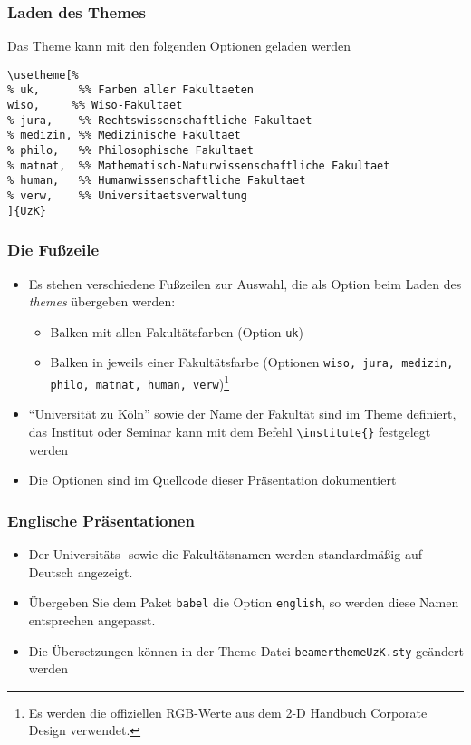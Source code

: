 \documentclass[9pt]{beamer}
\begin{document}
\begin{frame}[fragile]
  \frametitle{Laden des Themes}
  \begin{block}{Das Theme kann mit den folgenden Optionen geladen werden}
    \begin{small}
\begin{verbatim}
\usetheme[%
% uk,      %% Farben aller Fakultaeten
wiso,     %% Wiso-Fakultaet
% jura,    %% Rechtswissenschaftliche Fakultaet
% medizin, %% Medizinische Fakultaet
% philo,   %% Philosophische Fakultaet
% matnat,  %% Mathematisch-Naturwissenschaftliche Fakultaet
% human,   %% Humanwissenschaftliche Fakultaet
% verw,    %% Universitaetsverwaltung
]{UzK}
\end{verbatim}
    \end{small}

  \end{block}
\end{frame}

\begin{frame}
  \frametitle{Die Fußzeile}

  \begin{itemize}
  \item Es stehen verschiedene Fußzeilen zur Auswahl, die als Option
    beim Laden des \emph{themes} übergeben werden:
    \begin{itemize}
    \item Balken mit allen Fakultätsfarben (Option \texttt{uk})
    \item Balken in jeweils einer Fakultätsfarbe (Optionen \texttt{wiso, jura,
        medizin, philo, matnat, human, verw})\footnote{Es werden die offiziellen
        RGB-Werte aus dem 2-D Handbuch Corporate Design verwendet.}
    \end{itemize}
  \item "`Universität zu Köln"' sowie der Name der Fakultät sind im
    Theme definiert, das Institut oder Seminar kann mit dem Befehl
    \texttt{\textbackslash institute\{\}} festgelegt werden
  \item Die Optionen sind im Quellcode dieser Präsentation dokumentiert
  \end{itemize}

\end{frame}

\begin{frame}
  \frametitle{Englische Präsentationen}
  \begin{itemize}
  \item Der Universitäts- sowie die Fakultätsnamen werden
    standardmäßig auf Deutsch angezeigt.
  \item Übergeben Sie dem Paket \texttt{babel} die Option
    \texttt{english}, so werden diese Namen entsprechen angepasst.
  \item Die Übersetzungen können in der Theme-Datei
    \texttt{beamerthemeUzK.sty} geändert werden
  \end{itemize}

\end{frame}
\end{document}
